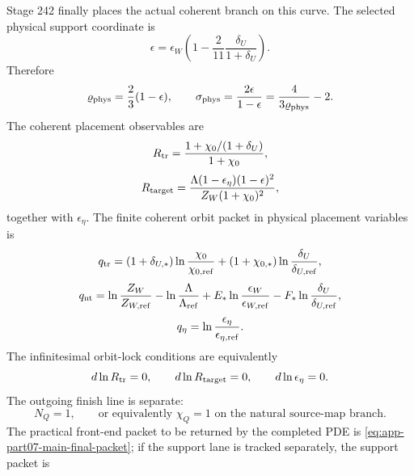 Stage 242 finally places the actual coherent branch on this curve.  The selected physical support coordinate is
\begin{equation}
\label{eq:app-part07-epsilon-physical}
\epsilon
=
\epsilon_W\left(1-\frac{2}{11}\frac{\delta_U}{1+\delta_U}\right).
\end{equation}
Therefore
\begin{equation}
\label{eq:app-part07-varrho-phys-sigma-phys}
\varrho_{\rm phys}=\frac23(1-\epsilon),
\qquad
\sigma_{\rm phys}=\frac{2\epsilon}{1-\epsilon}
=\frac{4}{3\varrho_{\rm phys}}-2.
\end{equation}
The coherent placement observables are
\begin{equation}
\label{eq:app-part07-rtr-coherent}
R_{\rm tr}
=
\frac{1+\chi_0/(1+\delta_U)}{1+\chi_0},
\end{equation}
\begin{equation}
\label{eq:app-part07-rtarget-coherent}
R_{\rm target}
=
\frac{\Lambda(1-\epsilon_\eta)(1-\epsilon)^2}{Z_W(1+\chi_0)^2},
\end{equation}
together with \(\epsilon_\eta\).  The finite coherent orbit packet in physical placement variables is
\begin{equation}
\label{eq:app-part07-stage242-qtr}
q_{\rm tr}
=(1+\delta_{U,*})\ln\frac{\chi_0}{\chi_{0,\rm ref}}
+(1+\chi_{0,*})\ln\frac{\delta_U}{\delta_{U,\rm ref}},
\end{equation}
\begin{equation}
\label{eq:app-part07-stage242-qnt}
q_{\rm nt}
=
\ln\frac{Z_W}{Z_{W,\rm ref}}
-
\ln\frac{\Lambda}{\Lambda_{\rm ref}}
+E_*\ln\frac{\epsilon_W}{\epsilon_{W,\rm ref}}
-F_*\ln\frac{\delta_U}{\delta_{U,\rm ref}},
\end{equation}
\begin{equation}
\label{eq:app-part07-stage242-qeta}
q_\eta=\ln\frac{\epsilon_\eta}{\epsilon_{\eta,\rm ref}}.
\end{equation}
The infinitesimal orbit-lock conditions are equivalently
\begin{equation}
\label{eq:app-part07-stage242-orbit-lock-inf}
d\ln R_{\rm tr}=0,
\qquad
d\ln R_{\rm target}=0,
\qquad
d\ln\epsilon_\eta=0.
\end{equation}
The outgoing finish line is separate:
\begin{equation}
\label{eq:app-part07-stage242-nq}
N_Q=1,
\qquad
\text{or equivalently }\chi_Q=1\text{ on the natural source-map branch.}
\end{equation}
The practical front-end packet to be returned by the completed PDE is \cref{eq:app-part07-main-final-packet}; if the support lane is tracked separately, the support packet is
